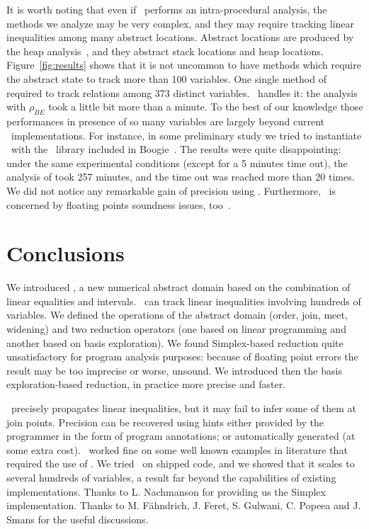 \documentclass{llncs}
\begin{document}
 It is worth noting that even if \Clousot\ performs an intra-procedural analysis, the methods we analyze may be very complex, and they may require tracking linear inequalities among many abstract locations.
Abstract locations are produced by the heap analysis~\cite{Logozzo07}, and they abstract stack locations and heap locations. 
Figure~\ref{fig:results} shows that it is not uncommon to have methods which require the abstract state to track more than 100 variables.
One single method of  required to track relations among 373 distinct variables.
\Subpoly\ handles it: the analysis with  $\rho_\mathit{BE}$ took a little bit more than a minute.
To the best of our knowledge those performances in presence of so many variables are largely beyond current \Polyhedra\ implementations.
For instance, in some preliminary study we tried to instantiate \Clousot\ with the \Poly\ library included in Boogie~\cite{boogie}.
The results were quite disappointing: under  the same experimental conditions (except for a 5 minutes time out), the analysis of  took 257 minutes, and the  time out was reached more than 20 times.
We did not notice any remarkable gain of precision using \Poly.
Furthermore, \Poly\ is concerned by floating points soundness issues,
too~\cite{ChenMineCousot08}.

\vspace{-0.2cm}

\section{Conclusions}
We introduced \Subpoly, a new numerical abstract domain based on the combination of linear equalities and intervals.
\Subpoly\ can track linear inequalities involving hundreds of variables.
We defined the operations of the abstract domain (order, join, meet,
widening) and two reduction operators (one based on linear programming and another based on basis exploration).
We found Simplex-based reduction quite unsatisfactory for program analysis purposes: because of floating point errors the result may be too imprecise or worse, unsound.
We introduced then  the basis exploration-based reduction, in practice more precise and faster.

\Subpoly\ precisely propagates linear inequalities, but it may fail to infer some of them at join points. 
Precision can be recovered using hints either provided  by the programmer in the form of program annotations; or automatically generated (at some extra cost).
\Subpoly\ worked fine on some well known examples in literature that required the use of \Polyhedra.
We tried \Subpoly\ on shipped code, and we showed that it scales  to
several hundreds of variables, a result far beyond the capabilities of
existing \Polyhedra{} implementations.
 Thanks to L. Nachmanson for providing us the Simplex implementation.
Thanks to M. F\"ahndrich, J. Feret, S. Gulwani, C. Popeea and J. Smans
for the useful discussions.
\end{document}
